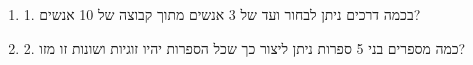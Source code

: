 \documentclass[12pt]{article}
\begin{document}
        \begin{enumerate}
        \item 1. בכמה דרכים ניתן לבחור ועד של 3 אנשים מתוך קבוצה של 10 אנשים?
\item 2.  כמה מספרים בני 5 ספרות ניתן ליצור כך שכל הספרות יהיו זוגיות ושונות זו מזו?
        \end{enumerate}
        
\end{document}
